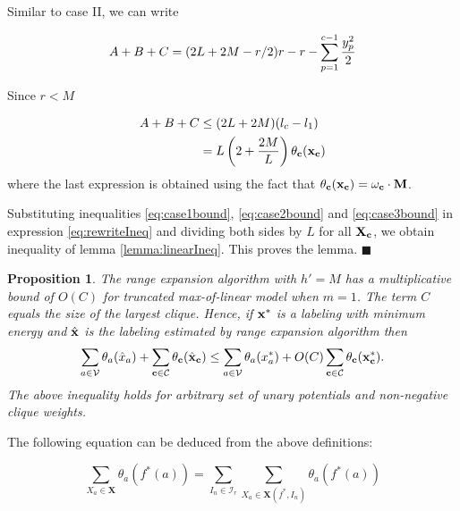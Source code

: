 \documentclass[10pt,letterpaper]{article}
\newtheorem{proposition}{Proposition}
\begin{document}
Similar to case II, we can write

\begin{equation*} \label{eq:rewrite_sum_ABC}
A + B + C = (2L + 2M - r/2)r - r -\sum_{p=1}^{c-1}\frac{y_{p}^2}{2} \\
\end{equation*}

Since $r < M$

\begin{align}
	A + B + C &\leq (2L + 2M)(l_{c} - l_{1}) \nonumber\\
		  & = L\left(2 + \frac{2M}{L}\right) \theta_{\bf c}(\bf{x_c}) \label{eq:case3bound}
\end{align}
where the last expression is obtained using the fact that $\theta_{\bf c}(\bf{x_c}) = \omega_c \cdot M$.

Substituting inequalities \eqref{eq:case1bound}, \eqref{eq:case2bound} and \eqref{eq:case3bound} in expression \eqref{eq:rewriteIneq} and dividing both sides by $L$ for all $\bf{X_c}$, we obtain inequality of lemma \ref{lemma:linearIneq}. This proves the lemma. \hspace{6mm} $\blacksquare$ 


\begin{proposition}
\label{prop:linearBound}
The range expansion algorithm with $h' = M$ has a multiplicative bound of $O(C)$ for truncated max-of-linear model when $m=1$. The
term $C$ equals the size of the largest clique. Hence, if ${\bf x}^*$ is a labeling with
minimum energy and $\hat{\bf x}$ is the labeling estimated by range expansion algorithm then
\begin{equation}
\small
\sum_{a \in {\cal V}} \theta_a(\hat{x}_a) + \sum_{{\bf c} \in {\cal C}} \theta_{\bf c}(\hat{\bf x}_{\bf c}) \leq \nonumber 
\sum_{a \in {\cal V}} \theta_a({x}^*_a) + O(C) \sum_{{\bf c} \in {\cal C}} \theta_{\bf c}({\bf x}^*_{\bf c}).
\label{eq:linear_bound}
\end{equation}
The above inequality holds for arbitrary set of unary potentials and non-negative clique weights.
\end{proposition}

The following equation can be deduced from the above definitions:

\begin{equation} \label{unary_sum}
	\sum_{X_a \in \mathbf{X}} \theta_a(f^*(a)) = \sum_{I_n \in \mathcal{I}_r} \sum_{X_a \in \mathbf{X}(f^*, I_{n})} \theta_{a}(f^*(a))
\end{equation}
\end{document}
